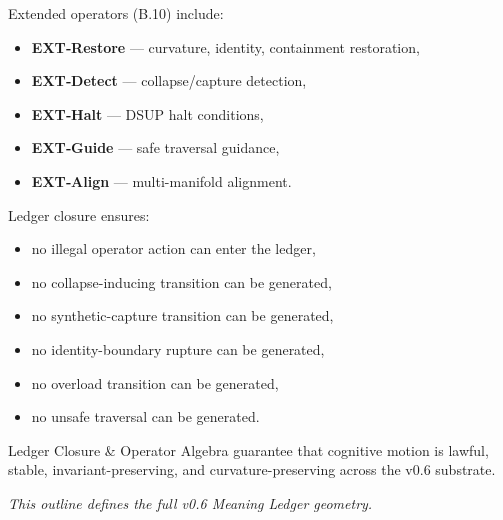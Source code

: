 \medskip

\noindent Extended operators (B.10) include:

\begin{itemize}
    \item \textbf{EXT‑Restore} — curvature, identity, containment restoration,
    \item \textbf{EXT‑Detect} — collapse/capture detection,
    \item \textbf{EXT‑Halt} — DSUP halt conditions,
    \item \textbf{EXT‑Guide} — safe traversal guidance,
    \item \textbf{EXT‑Align} — multi-manifold alignment.
\end{itemize}

\medskip

\noindent Ledger closure ensures:

\begin{itemize}
    \item no illegal operator action can enter the ledger,
    \item no collapse-inducing transition can be generated,
    \item no synthetic-capture transition can be generated,
    \item no identity-boundary rupture can be generated,
    \item no overload transition can be generated,
    \item no unsafe traversal can be generated.
\end{itemize}

\medskip

\noindent Ledger Closure & Operator Algebra guarantee that cognitive motion is
lawful, stable, invariant-preserving, and curvature-preserving across the v0.6
substrate.


\medskip
\noindent\textit{This outline defines the full v0.6 Meaning Ledger geometry.}
